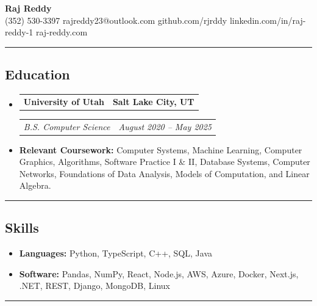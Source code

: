 \documentclass[10pt,letterpaper]{article}
\makeatletter
\newcommand{\headerrow}[2]
{\begin{tabular*}{\linewidth}{l@{\extracolsep{\fill}}r}
#1 &
#2 \\
\end{tabular*}}
\makeatother
\begin{document}
\begin{center}
	{\LARGE \textbf{Raj Reddy}}\\
	\vspace{0.05cm}
	(352) 530-3397
    \hfill rajreddy23@outlook.com
    \hfill github.com/rjrddy
    \hfill linkedin.com/in/raj-reddy-1
    \hfill raj-reddy.com
\end{center}
\hrule
{}

\vspace{-1em}
\subsection*{\Large Education}
\renewcommand\labelitemi{}
\begin{itemize}[leftmargin=1em]
	\parskip=0.1em
	\item
	      \headerrow
	      {\textbf{University of Utah}}
	      {\textbf{Salt Lake City, UT}}
	      \headerrow
	      {\emph{B.S. Computer Science}}
	      {\emph{August 2020 -- May 2025}}
	      \item \textbf{Relevant Coursework:} Computer Systems, Machine Learning, Computer Graphics, Algorithms, Software Practice I \& II, Database Systems, Computer Networks, Foundations of Data Analysis, Models of Computation, and Linear Algebra.
\end{itemize}
\hrule
{}

\vspace{-1em}
\subsection*{\Large Skills}
\begin{itemize}[leftmargin=1em]
    \parskip=0.1em
	\item \textbf{Languages:} Python, TypeScript, C++, SQL, Java
	\item \textbf{Software:} Pandas, NumPy, React, Node.js, AWS, Azure, Docker, Next.js, .NET, REST, Django, MongoDB, Linux
\end{itemize}
\hrule
{}

\vspace{-1em}
\end{document}

